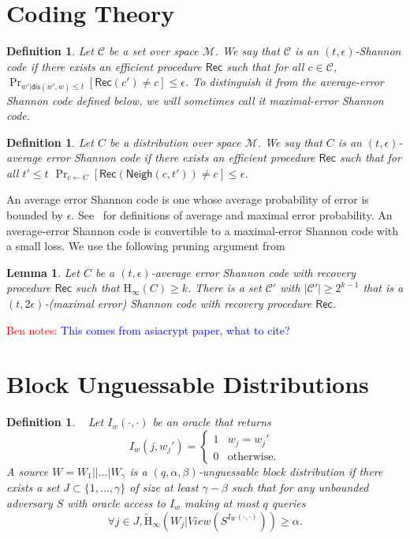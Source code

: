 \documentclass[11pt]{article}
\newcommand{\secref}[1]{\mbox{Section~\ref{#1}}}
\newcommand{\class}[1]{{\ensuremath{\mathsf{#1}}}}
\newcommand{\rec}{\ensuremath{\class{Rec}}\xspace}
\newcommand{\neigh}{\ensuremath{\class{Neigh}}\xspace}
\newcommand{\dis}{\ensuremath{\mathsf{dis}}}
\newcommand{\Hoo}{\mathrm{H}_\infty}
\newcommand{\Hav}{\tilde{\mathrm{H}}_\infty}
\newtheorem{lemma}[theorem]{Lemma}
\newtheorem{definition}[theorem]{Definition}
\newcommand{\authnote}[2]{{\textcolor{red}{\textsf{#1 notes: }\textcolor{blue}{ #2}}\marginpar{\textcolor{red}{\textbf{!!!!!}}}}}
\newcommand{\authnote}[2]{}
\newcommand{\bnote}[1]{{\authnote{Ben}{#1}}}
\begin{document}



\appendix
\section{Coding Theory}
\begin{definition}
\label{def:shannon-code}
Let $\mathcal{C}$ be a set over space $\mathcal{M}$.  We say that $\mathcal{C}$ is an $(t,\epsilon)$-\emph{Shannon code} if there exists an efficient procedure $\rec$ such that for all $c\in \mathcal{C}$, $\Pr_{w' | \dis(w', w)\le t}[\rec(c') \neq c]\le \epsilon$. To distinguish it from the average-error Shannon code defined below, we will sometimes call it \emph{maximal-error} Shannon code.
\end{definition}


 \begin{definition}
Let $C$ be a distribution over space $\mathcal{M}$.  We say that $C$ is an $(t,\epsilon)$-\emph{average error Shannon code} if there exists an efficient procedure $\rec$ such that for all $t'\le t$
$\Pr_{c\leftarrow C}[\rec(\neigh(c, t')) \neq c]\le \epsilon$.
\end{definition}
An average error Shannon code is one whose average probability of error is bounded by $\epsilon$.  See~\cite[Pages 192-194]{cover2006elements} for definitions of average and maximal error probability.  An average-error Shannon code is convertible to a maximal-error Shannon code with a small loss.  We use the following pruning argument from~\cite[Pages 202-204]{cover2006elements} %
\begin{lemma}
\label{lem:averageToMaximalError}
Let $C$ be a $(t, \epsilon)$-average error Shannon code with recovery procedure $\rec$ such that $\Hoo(C)\geq k$.  There is a set $\mathcal{C}'$ with $|\mathcal{C}'|\ge2^{k-1}$ that  is a $(t, 2\epsilon)$-(maximal error) Shannon code with recovery procedure $\rec$.
\end{lemma}

\bnote{This comes from asiacrypt paper, what to cite?}
\section{Block Unguessable Distributions}
\begin{definition}~\cite[Definition 4.2]{canetti2014key}
\label{def:block guessable}
Let $I_w (\cdot, \cdot)$ be an oracle that returns \[I_w(j, w_j')=
\begin{cases}
1 & w_j = w_j'\\
0 & \text{otherwise}.
\end{cases}
\]
A source $W = W_1||...|W_\gamma$ is a $(q, \alpha, \beta)$-\emph{unguessable block distribution} if there exists a set $J\subset\{1,..., \gamma\}$ of size at least $\gamma -\beta$ such that for any unbounded adversary $S$ with oracle access to $I_w$ making at most $q$ queries
\[
\forall j\in J, \Hav(W_j |View(S^{I_{W}(\cdot, \cdot)}))\geq \alpha.
\]
\end{definition}
\end{document}
